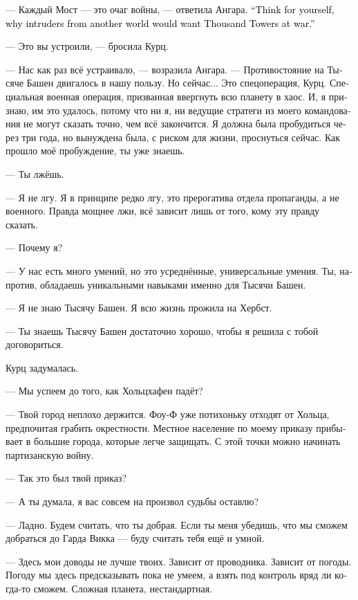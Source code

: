 \documentclass[a4paper,12pt,fleqn]{book}\usepackage{cooltooltips}\usepackage{polyglossia}\setdefaultlanguage[babelshorthands=true]{russian}\setotherlanguage{english}\defaultfontfeatures{Ligatures=TeX,Mapping=tex-text} \usepackage{xcolor}\definecolor{lightgray}{HTML}{bbbbbb}\color{lightgray}\newcommand{\ml}[3]{\textenglish{\textcolor{black}{#3}}}
\begin{document}
--- Каждый Мост --- это очаг войны, --- ответила Ангара.
\ml{$0$}
{--- Сама думай, зачем пришельцам из другого мира война на Тысяче Башен.}
{``Think for yourself, why intruders from another world would want Thousand Towers at war.''}

--- Это вы устроили, --- бросила Курц.

--- Нас как раз всё устраивало, --- возразила Ангара.
--- Противостояние на Тысяче Башен двигалось в нашу пользу.
Но сейчас...
Это спецоперация, Курц.
Специальная военная операция, призванная ввергнуть всю планету в хаос.
И, я признаю, им это удалось, потому что ни я, ни ведущие стратеги из моего командования не могут сказать точно, чем всё закончится.
Я должна была пробудиться через три года, но вынуждена была, с риском для жизни, проснуться сейчас.
Как прошло моё пробуждение, ты уже знаешь.

--- Ты лжёшь.

--- Я не лгу.
Я в принципе редко лгу, это прерогатива отдела пропаганды, а не военного.
Правда мощнее лжи, всё зависит лишь от того, кому эту правду сказать.

--- Почему я?

--- У нас есть много умений, но это усреднённые, универсальные умения.
Ты, напротив, обладаешь уникальными навыками именно для Тысячи Башен.

--- Я не знаю Тысячу Башен.
Я всю жизнь прожила на Хербст.

--- Ты знаешь Тысячу Башен достаточно хорошо, чтобы я решила с тобой договориться.

Курц задумалась.

--- Мы успеем до того, как Хольцхафен падёт?

--- Твой город неплохо держится.
Фоу-Ф уже потихоньку отходят от Хольца, предпочитая грабить окрестности.
Местное население по моему приказу прибывает в большие города, которые легче защищать.
С этой точки можно начинать партизанскую войну.

--- Так это был твой приказ?

--- А ты думала, я вас совсем на произвол судьбы оставлю?

--- Ладно.
Будем считать, что ты добрая.
Если ты меня убедишь, что мы сможем добраться до Гарда Викка --- буду считать тебя ещё и умной.

--- Здесь мои доводы не лучше твоих.
Зависит от проводника.
Зависит от погоды.
Погоду мы здесь предсказывать пока не умеем, а взять под контроль вряд ли когда-то сможем.
Сложная планета, нестандартная.
\end{document}
